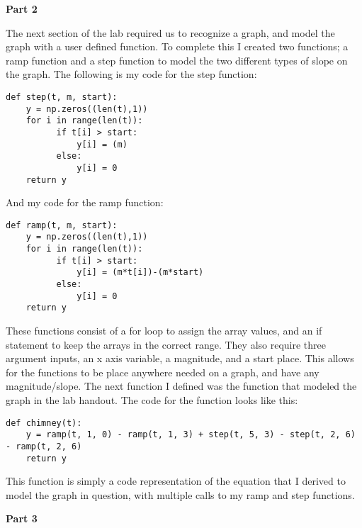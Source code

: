 \documentclass[12pt]{report}
\begin{document}
{\noindent\textbf{Part 2}

The next section of the lab required us to recognize a graph, and model the graph with a user defined function. To complete this I created two functions; a ramp function and a step function to model the two different types of slope on the graph. The following is my code for the step function:
\begin{lstlisting}
def step(t, m, start):
    y = np.zeros((len(t),1))
    for i in range(len(t)):
          if t[i] > start:
              y[i] = (m)
          else:
              y[i] = 0
    return y
\end{lstlisting}
And my code for the ramp function:
\begin{lstlisting}
def ramp(t, m, start):
    y = np.zeros((len(t),1))
    for i in range(len(t)):
          if t[i] > start:
              y[i] = (m*t[i])-(m*start)
          else:
              y[i] = 0
    return y
\end{lstlisting}
These functions consist of a for loop to assign the array values, and an if statement to keep the arrays in the correct range. They also require three argument inputs, an x axis variable, a magnitude, and a start place. This allows for the functions to be place anywhere needed on a graph, and have any magnitude/slope. The next function I defined was the function that modeled the graph in the lab handout. The code for the function looks like this:
\begin{lstlisting}
def chimney(t):
    y = ramp(t, 1, 0) - ramp(t, 1, 3) + step(t, 5, 3) - step(t, 2, 6) - ramp(t, 2, 6)
    return y
\end{lstlisting}
This function is simply a code representation of the equation that I derived to model the graph in question, with multiple calls to my ramp and step functions.\newline

\noindent\textbf{Part 3}

}
\end{document}
